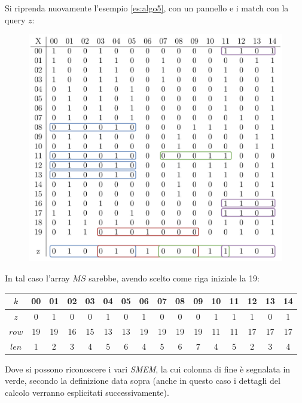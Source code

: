 \begin{esempio}
  \label{es:ms}
  Si riprenda nuovamente l'esempio \ref{es:algo5}, con un pannello e i match con
  la query $z$:
  \begin{figure}[H]
    \centering
    \includegraphics[scale = 0.365]{img/pbwtmatch.pdf}
  \end{figure}
  In tal caso l'array $MS$ sarebbe, avendo scelto come riga iniziale la 19:
  \begin{table}[H]
    \footnotesize{}
    \centering
    \begin{tabular}{c|ccccccccccccccc}
      $k$ & 00 & 01 & 02 & 03 & 04 &  {\color{nordgreen}05} & 06 & 07 & 08
      &  {\color{nordgreen}09} & 10 &  {\color{nordgreen}11} & 12 & 13
      &  {\color{nordgreen}14} \\
      \hline
      \hline
      $z$ & 0 & 1 & 0 & 0 & 1 &  {\color{nordgreen}0} & 1 & 0 & 0
      &  {\color{nordgreen}0} & 1 &  {\color{nordgreen}1} & 1 & 0
      &  {\color{nordgreen}1} \\
      \hline
      $row$ & 19 & 19 & 16 & 15 & 13 &  {\color{nordgreen}13} & 19 & 19 & 19
      &  {\color{nordgreen}19} & 11 &  {\color{nordgreen}11} & 17 & 17
      &  {\color{nordgreen}17} \\
      $len$ & 1 & 2 & 3 & 4 & 5 & {\color{nordgreen}6} & 4 & 5 & 6
      & {\color{nordgreen}7} & 4 & {\color{nordgreen}5} & 2 & 3
      & {\color{nordgreen}4}\\
    \end{tabular}
  \end{table}
  Dove si possono riconoscere i vari \textit{SMEM}, la cui colonna di fine è
  segnalata in verde, secondo la definizione data
  sopra (anche in questo caso i dettagli del calcolo
  verranno esplicitati successivamente). 
\end{esempio}
